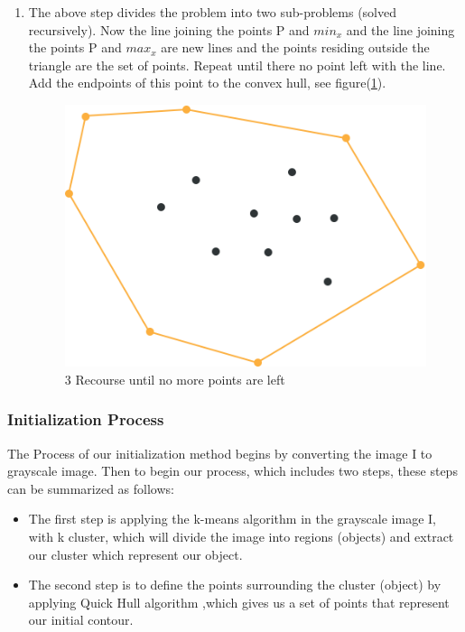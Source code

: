 \begin{enumerate}
    \item The above step divides the problem into two sub-problems (solved
    recursively). Now the line joining the points P and $min_x$ and the line joining
    the points P and $max_x$ are new lines and the points residing outside the
    triangle are the set of points. Repeat until there no point left with the line. Add
    the endpoints of this point to the convex hull, see figure(\ref{fig:figure3.4}).\\
    \begin{figure}[ht!]
        \centering
        \includegraphics[width=12cm]{chapiter3/figures/figure 04 3 Recourse until no more points are left.png}
        \setlength{\fboxrule}{2pt}
        \caption{3 Recourse until no more points are left}
        \label{fig:figure3.4}
    \end{figure}

\end{enumerate}

\subsubsection{Initialization Process}
The Process of our initialization method begins by converting the image I to grayscale
image. Then to begin our process, which includes two steps, these steps can be
summarized as follows:
\begin{itemize}
    \item The first step is applying the k-means algorithm in the grayscale image I, with k
    cluster, which will divide the image into regions (objects) and extract our
    cluster which represent our object.
    \item The second step is to define the points surrounding the cluster (object) by
    applying Quick Hull algorithm ,which gives us a set of points that represent our
    initial contour.
\end{itemize}

